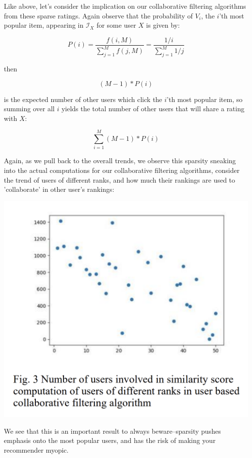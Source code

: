 Like above, let's consider the implication on our collaborative filtering algorithms from these sparse ratings. Again observe that the probability of $V_i$, the $i$'th most popular item, appearing in $\mathcal{I}_X$ for some user $X$ is given by:

\begin{equation}
    P(i)=\frac{f(i,M)}{\sum^M_{j=1}f(j,M)}=\frac{1/i}{\sum^M_{j=1}1/j}
\end{equation}

then 

$$(M-1)*P(i)$$

is the expected number of other users which click the $i$'th most popular item, so summing over all $i$ yields the total number of other users that will share a rating with $X$:

\begin{equation}
    \sum_{i=1}^M (M-1)*P(i)
\end{equation}

Again, as we pull back to the overall trends, we observe this sparsity sneaking into the actual computations for our collaborative filtering algorithms, consider the trend of users of different ranks, and how much their rankings are used to 'collaborate' in other user's rankings:

\includegraphics[width=\textwidth-10pt]{book-text/user-sim-counts.png}

We see that this is an important result to always beware–sparsity pushes emphasis onto the most popular users, and has the risk of making your recommender myopic. 

